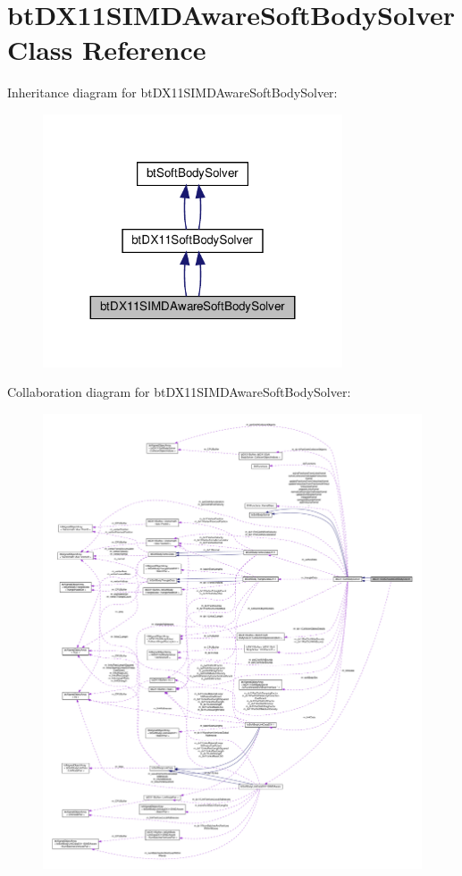 \hypertarget{classbtDX11SIMDAwareSoftBodySolver}{}\section{bt\+D\+X11\+S\+I\+M\+D\+Aware\+Soft\+Body\+Solver Class Reference}
\label{classbtDX11SIMDAwareSoftBodySolver}


Inheritance diagram for bt\+D\+X11\+S\+I\+M\+D\+Aware\+Soft\+Body\+Solver\+:
\nopagebreak
\begin{figure}[H]
\begin{center}
\leavevmode
\includegraphics[width=251pt]{classbtDX11SIMDAwareSoftBodySolver__inherit__graph}
\end{center}
\end{figure}


Collaboration diagram for bt\+D\+X11\+S\+I\+M\+D\+Aware\+Soft\+Body\+Solver\+:
\nopagebreak
\begin{figure}[H]
\begin{center}
\leavevmode
\includegraphics[width=350pt]{classbtDX11SIMDAwareSoftBodySolver__coll__graph}
\end{center}
\end{figure}

